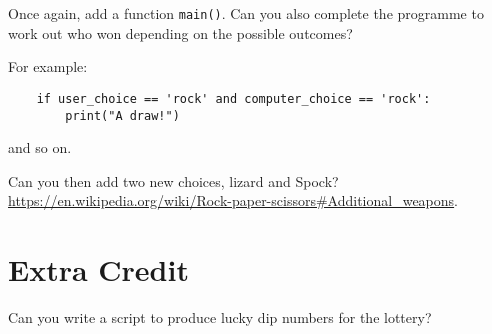 \documentclass[12pt,oneside]{cttutorial}
\begin{document}
Once again, add a function \lstinline!main()!. Can you also complete the programme to work out who won depending on the possible outcomes?

For example:

\begin{lstlisting}
    if user_choice == 'rock' and computer_choice == 'rock':
        print("A draw!")
\end{lstlisting}
and so on.

Can you then add two new choices, lizard and Spock? \url{https://en.wikipedia.org/wiki/Rock-paper-scissors#Additional_weapons}.



\section{Extra Credit}

Can you write a script to produce lucky dip numbers for the lottery?
\end{document}

